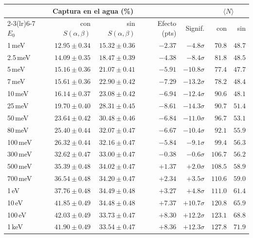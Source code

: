 \begin{tabular}{lrrrrrr}
\toprule
& \multicolumn{2}{c}{Captura en el agua (\%)} & & & \multicolumn{2}{c}{$\langle N\rangle$} \\
\cmidrule(lr){2-3}\cmidrule(lr){6-7}
$E_0$ & con $S(\alpha,\beta)$ & sin $S(\alpha,\beta)$ & Efecto (pts) & Signif. & con & sin \\
\midrule
1\,meV & $12.95\pm0.34$ & $15.32\pm0.36$ & $-2.37$ & $-4.8\sigma$ & $70.8$ & $48.7$ \\
2.5\,meV & $14.09\pm0.35$ & $18.47\pm0.39$ & $-4.38$ & $-8.4\sigma$ & $81.8$ & $48.5$ \\
5\,meV & $15.16\pm0.36$ & $21.07\pm0.41$ & $-5.91$ & $-10.8\sigma$ & $77.4$ & $47.7$ \\
7\,meV & $15.61\pm0.36$ & $22.90\pm0.42$ & $-7.29$ & $-13.2\sigma$ & $78.2$ & $48.4$ \\
10\,meV & $16.14\pm0.37$ & $23.08\pm0.42$ & $-6.94$ & $-12.4\sigma$ & $90.6$ & $48.1$ \\
25\,meV & $19.70\pm0.40$ & $28.31\pm0.45$ & $-8.61$ & $-14.3\sigma$ & $90.7$ & $51.4$ \\
50\,meV & $23.64\pm0.42$ & $30.48\pm0.46$ & $-6.84$ & $-11.0\sigma$ & $96.7$ & $53.1$ \\
80\,meV & $25.40\pm0.44$ & $32.07\pm0.47$ & $-6.67$ & $-10.4\sigma$ & $92.1$ & $55.9$ \\
100\,meV & $26.32\pm0.44$ & $32.16\pm0.47$ & $-5.84$ & $-9.1\sigma$ & $99.4$ & $56.3$ \\
300\,meV & $32.62\pm0.47$ & $33.00\pm0.47$ & $-0.38$ & $-0.6\sigma$ & $106.7$ & $56.2$ \\
500\,meV & $35.39\pm0.48$ & $34.02\pm0.47$ & $+1.37$ & $+2.0\sigma$ & $108.5$ & $58.9$ \\
700\,meV & $36.54\pm0.48$ & $34.20\pm0.47$ & $+2.34$ & $+3.5\sigma$ & $110.6$ & $59.0$ \\
1\,eV & $37.76\pm0.48$ & $34.49\pm0.48$ & $+3.27$ & $+4.8\sigma$ & $111.0$ & $61.4$ \\
10\,eV & $41.85\pm0.49$ & $34.48\pm0.48$ & $+7.37$ & $+10.7\sigma$ & $120.8$ & $65.9$ \\
100\,eV & $42.03\pm0.49$ & $33.73\pm0.47$ & $+8.30$ & $+12.2\sigma$ & $123.1$ & $68.8$ \\
1\,keV & $41.90\pm0.49$ & $33.54\pm0.47$ & $+8.36$ & $+12.3\sigma$ & $127.8$ & $71.9$ \\
\bottomrule
\end{tabular}
